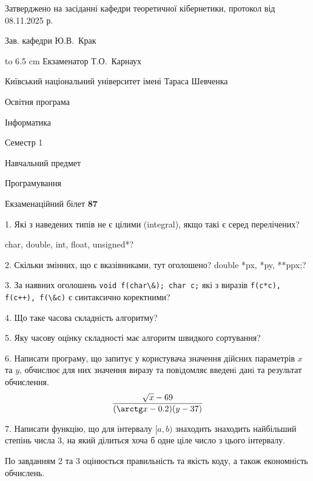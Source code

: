 \documentclass[12pt, ukrainian]{article}
\def\code#1{\Verb!#1!}
\begin{document}
{\smallskip\smallskip \begin {scriptsize} Затверджено на засіданні кафедри теоретичної кібернетики, протокол   від   08.11.2025 р.\par\smallskip\smallskip\smallskip\smallskip
{\parbox {6.5 cm} {Зав. кафедри \dotfill Ю.В.~Крак}}\hspace {0.7cm} {\hbox to 6.5 cm { Екзаменатор \dotfill Т.О.~Карнаух}} \end{scriptsize}}
\newpage
{{\begin {scriptsize}\par
{ \center  Київський національний університет імені Тараса Шевченка \par}
{\parbox {5 cm}{Освітня програма \hfill}{\parbox {7 cm}{Інформатика\hfill}}\parbox {6 cm}{\hfill Семестр 1}}\par
{\parbox {5 cm} {Навчальний предмет \hfill}\parbox {7 cm}{Програмування \hfill}\parbox {6cm}{\hfill}\par}\vspace{-15pt} \end{scriptsize}}{\center Екзаменаційний білет \No \textbf { 87 }\par}}
{%
1. Які з наведених типів не є цілими (integral), якщо такі є серед перелічених?

char, double, int, float, unsigned*?
\par
\vspace{2mm}
2. Скільки змінних, що є вказівниками, тут оголошено?
double *px, *py, **ppx;?
\par
\vspace{2mm}
3. За наявних оголошень \code{void f(char\&); char c;} які з виразів \code{f(c*c), f(c++), f(\&c)} є синтаксично коректними?
\par
\vspace{2mm}
4. Що таке часова складність алгоритму?
\par
\vspace{2mm}
5. Яку часову оцінку складності має алгоритм швидкого сортування?
\par
\vspace{2mm}
6. Написати програму, що запитує у користувача значення дійсних параметрів $x$ та $y$, обчислює для них значення виразу та повiдомляє введенi данi та результат обчислення.
$$\frac{\sqrt x - 69}{(\arctg x - 0.2) (y - 37)}$$ 

\par
7. Написати функцію, що для інтервалу $[a, b)$ знаходить знаходить найбільший степінь числа 3, на який ділиться хоча б одне ціле число з цього інтервалу.

По завданням 2 та 3 оцінюється правильність та якість коду, а також економність обчислень.

}
\end{document}
